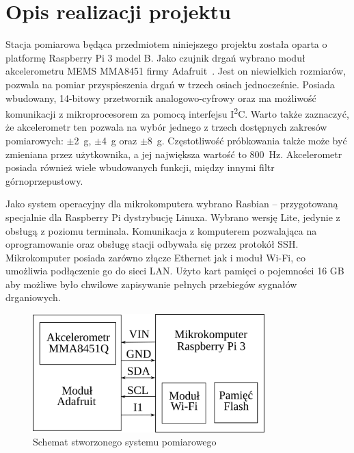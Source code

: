 \documentclass[a4paper,12pt]{mwart}
\let\Oldsection\section
\renewcommand{\section}{\FloatBarrier\Oldsection}
\begin{document}
\section{Opis realizacji projektu}

Stacja pomiarowa będąca przedmiotem niniejszego projektu została oparta o
platformę Raspberry Pi 3 model B. Jako czujnik drgań wybrano moduł
akcelerometru MEMS MMA8451 firmy Adafruit~\cite{mma8451}. Jest on niewielkich
rozmiarów, pozwala na pomiar przyspieszenia drgań w trzech osiach jednocześnie.
Posiada wbudowany, 14-bitowy przetwornik analogowo-cyfrowy oraz ma możliwość
komunikacji z mikroprocesorem za pomocą interfejsu I\textsuperscript{2}C. Warto
także zaznaczyć, że akcelerometr ten pozwala na wybór jednego z trzech
dostępnych zakresów pomiarowych: $\pm$\SI{2}{\g}, $\pm$\SI{4}{\g} oraz
$\pm$\SI{8}{\g}.  Częstotliwość próbkowania także może być zmieniana przez
użytkownika, a jej największa wartość to \SI{800}{\hertz}. Akcelerometr posiada
również wiele wbudowanych funkcji, między innymi filtr górnoprzepustowy.

Jako system operacyjny dla mikrokomputera wybrano Rasbian -- przygotowaną
specjalnie dla Raspberry Pi dystrybucję Linuxa. Wybrano wersję Lite, jedynie z
obsługą z poziomu terminala. Komunikacja z komputerem pozwalająca na
oprogramowanie oraz obsługę stacji odbywała się przez protokół SSH.
Mikrokomputer posiada zarówno złącze Ethernet jak i moduł Wi-Fi, co umożliwia
podłączenie go do sieci LAN. Użyto kart pamięci o pojemności 16 GB aby możliwe
było chwilowe zapisywanie pełnych przebiegów sygnałów drganiowych.

\begin{figure}[!tbh]
  \centering
  \includegraphics[width=0.8\textwidth]{bitgraphics/schemat.svg.png}
  \caption{Schemat stworzonego systemu pomiarowego}
  \label{fig:schemat}
\end{figure}
\end{document}
